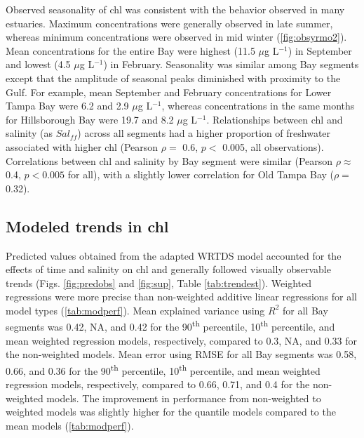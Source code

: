 \documentclass{svjour3}\usepackage[]{graphicx}\usepackage[]{color}
\newcommand{\mugl}{$\mu$g L$^{-1}$}
\begin{document}
Observed seasonality of \ac{chl} was consistent with the behavior observed in many estuaries.  Maximum concentrations were generally observed in late summer, whereas minimum concentrations were observed in mid winter (\cref{fig:obsyrmo2}).  Mean concentrations for the entire Bay were highest (11.5 \mugl) in September and lowest (4.5 \mugl) in February.  Seasonality was similar among Bay segments except that the amplitude of seasonal peaks diminished with proximity to the Gulf.  For example, mean September and February concentrations for Lower Tampa Bay were 6.2 and 2.9 \mugl, whereas concentrations in the same months for Hillsborough Bay were 19.7 and 8.2 \mugl.  Relationships between \ac{chl} and salinity (as $Sal_{ff}$) across all segments had a higher proportion of freshwater associated with higher \ac{chl} (Pearson $\rho=$ 0.6, $p<$ 0.005, all observations).  Correlations between \ac{chl} and salinity by Bay segment were similar (Pearson $\rho \approx$ 0.4, $p<0.005$ for all), with a slightly lower correlation for Old Tampa Bay ($\rho=$ 0.32).

\subsection{Modeled trends in \acl{chl}}

Predicted values obtained from the adapted \ac{WRTDS} model accounted for the effects of time and salinity on \ac{chl} and generally followed visually observable trends (Figs. \ref{fig:predobs} and \ref{fig:sup}, Table \ref{tab:trendest}).  Weighted regressions were more precise than non-weighted additive linear regressions for all model types (\cref{tab:modperf}).   Mean explained variance using $R^2$ for all Bay segments was 0.42, NA, and 0.42 for the 90\textsuperscript{th} percentile, 10\textsuperscript{th} percentile, and mean weighted regression models, respectively, compared to 0.3, NA, and 0.33 for the non-weighted models.  Mean error using \ac{RMSE} for all Bay segments was 0.58, 0.66, and 0.36 for the 90\textsuperscript{th} percentile, 10\textsuperscript{th} percentile, and mean weighted regression models, respectively, compared to 0.66, 0.71, and 0.4 for the non-weighted models.  The improvement in performance from non-weighted to weighted models was slightly higher for the quantile models compared to the mean models (\cref{tab:modperf}).    
\end{document}
